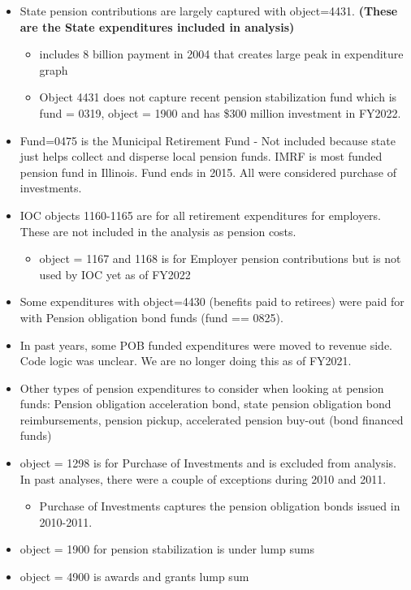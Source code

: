 \documentclass[
  letterpaper,
  DIV=11,
  numbers=noendperiod]{scrreport}
\providecommand{\tightlist}{%
  \setlength{\itemsep}{0pt}\setlength{\parskip}{0pt}}\usepackage{longtable,booktabs,array}
\begin{document}
\begin{itemize}
\tightlist
\item
  State pension contributions are largely captured with object=4431.
  \textbf{(These are the State expenditures included in analysis)}

  \begin{itemize}
  \tightlist
  \item
    includes 8 billion payment in 2004 that creates large peak in
    expenditure graph
  \item
    Object 4431 does not capture recent pension stabilization fund which
    is fund = 0319, object = 1900 and has \$300 million investment in
    FY2022.
  \end{itemize}
\item
  Fund=0475 is the Municipal Retirement Fund - Not included because
  state just helps collect and disperse local pension funds. IMRF is
  most funded pension fund in Illinois. Fund ends in 2015. All were
  considered purchase of investments.
\item
  IOC objects 1160-1165 are for all retirement expenditures for
  employers. These are not included in the analysis as pension costs.

  \begin{itemize}
  \tightlist
  \item
    object = 1167 and 1168 is for Employer pension contributions but is
    not used by IOC yet as of FY2022
  \end{itemize}
\item
  Some expenditures with object=4430 (benefits paid to retirees) were
  paid for with Pension obligation bond funds (fund == 0825).
\item
  In past years, some POB funded expenditures were moved to revenue
  side. Code logic was unclear. We are no longer doing this as of
  FY2021.
\item
  Other types of pension expenditures to consider when looking at
  pension funds: Pension obligation acceleration bond, state pension
  obligation bond reimbursements, pension pickup, accelerated pension
  buy-out (bond financed funds)
\item
  object = 1298 is for Purchase of Investments and is excluded from
  analysis. In past analyses, there were a couple of exceptions during
  2010 and 2011.

  \begin{itemize}
  \tightlist
  \item
    Purchase of Investments captures the pension obligation bonds issued
    in 2010-2011.
  \end{itemize}
\item
  object = 1900 for pension stabilization is under lump sums
\item
  object = 4900 is awards and grants lump sum
\end{itemize}
\end{document}
